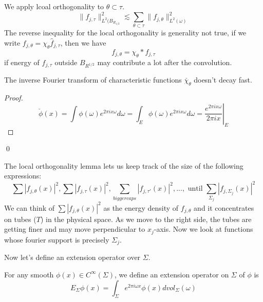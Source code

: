 We apply lcoal orthogonality to $\theta\subset\tau$. 
\begin{equation*}
    \|f_{j,\tau}\|_{L^2(B_{R_{1/2}}}^2\lesssim \sum_{\theta\subset\tau}\|f_{j,\theta}\|_{L^2(\omega)}^2
\end{equation*}
The reverse inequality for the local orthogonality is generality not true, if we write $f_{j,\theta}=\chi_\theta\widehat{f}_{j,\tau}$, then we have
\begin{equation*}
    f_{j,\theta}=\chi_\theta\ast f_{j,\tau}
\end{equation*}
if energy of $f_{j,\tau}$ outside $B_{R^{1/2}}$ may contribute a lot after the convolution. 
\begin{proposition}
    The inverse Fourier transform of characteristic functions $\check{\chi_\theta}$ doesn't decay fast. 
\end{proposition}
\begin{proof}
\begin{equation*}
    \check{\phi}(x)=\int\phi(\omega)e^{2\pi ix\omega}d\omega=\int_E\phi(\omega)e^{2\pi ix\omega}d\omega=\left.\frac{e^{2\pi ix\omega}}{2\pi ix}\right\vert_E
\end{equation*}
\end{proof}
\qed

The local orthogonality lemma lets us keep track of the size of the following expressions:
\begin{equation*}
    \sum|f_{j,\theta}(x)|^2, \sum|f_{j,\tau}(x)|^2, \sum_{bigger caps}|f_{j,\tau'}(x)|^2,..., \text{ until } \sum_{\Sigma_j}|f_{j,\Sigma_j}(x)|^2
\end{equation*}
We can think of $\sum|f_{j,\theta}(x)|^2$ as the energy density of $f_{j,\theta}$ and it concentrates on tubes ($T$) in the physical space. As we move to the right side, the tubes are getting finer and may move perpendicular to $x_j$-axis. Now we look at functions whose fourier support is precisely $\Sigma_j$.

Now let's define an extension operator over $\Sigma$.
\begin{definition}
    For any smooth $\phi(x)\in C^\infty(\Sigma)$, we define an extension operator on $\Sigma$ of $\phi$ is 
    \begin{equation*}
        E_\Sigma\phi(x)=\int_\Sigma e^{2\pi i\omega x}\phi(x)dvol_\Sigma(\omega)
    \end{equation*}
\end{definition}

